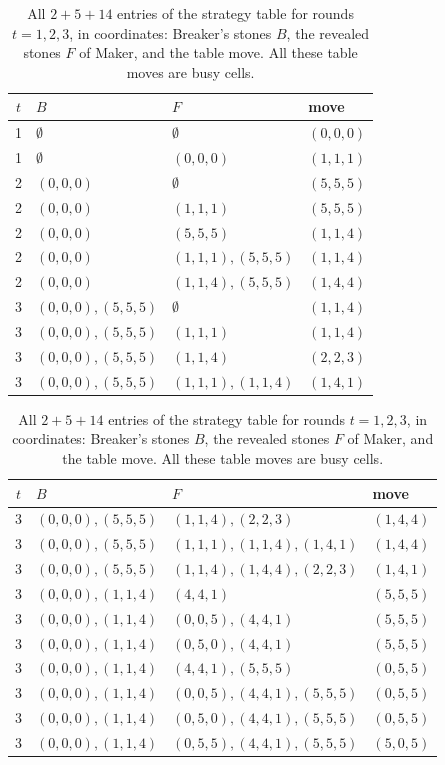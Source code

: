 \begin{table}[ht]
\centering\footnotesize
\begin{tabular}[t]{@{}clll@{}}
\toprule
$t$ & $B$ & $F$ & move\\
\midrule
1 & $\emptyset$ & $\emptyset$ & $(0,0,0)$\\
1 & $\emptyset$ & $(0,0,0)$ & $(1,1,1)$\\
\midrule
2 & $(0,0,0)$ & $\emptyset$ & $(5,5,5)$\\
2 & $(0,0,0)$ & $(1,1,1)$ & $(5,5,5)$\\
2 & $(0,0,0)$ & $(5,5,5)$ & $(1,1,4)$\\
2 & $(0,0,0)$ & $(1,1,1),(5,5,5)$ & $(1,1,4)$\\
2 & $(0,0,0)$ & $(1,1,4),(5,5,5)$ & $(1,4,4)$\\
\midrule
3 & $(0,0,0),(5,5,5)$ & $\emptyset$ & $(1,1,4)$\\
3 & $(0,0,0),(5,5,5)$ & $(1,1,1)$ & $(1,1,4)$\\
3 & $(0,0,0),(5,5,5)$ & $(1,1,4)$ & $(2,2,3)$\\
3 & $(0,0,0),(5,5,5)$ & $(1,1,1),(1,1,4)$ & $(1,4,1)$\\
\bottomrule
\end{tabular}\hfill
\begin{tabular}[t]{@{}clll@{}}
\toprule
$t$ & $B$ & $F$ & move\\
\midrule
3 & $(0,0,0),(5,5,5)$ & $(1,1,4),(2,2,3)$ & $(1,4,4)$\\
3 & $(0,0,0),(5,5,5)$ & $(1,1,1),(1,1,4),(1,4,1)$ & $(1,4,4)$\\
3 & $(0,0,0),(5,5,5)$ & $(1,1,4),(1,4,4),(2,2,3)$ & $(1,4,1)$\\
3 & $(0,0,0),(1,1,4)$ & $(4,4,1)$ & $(5,5,5)$\\
3 & $(0,0,0),(1,1,4)$ & $(0,0,5),(4,4,1)$ & $(5,5,5)$\\
3 & $(0,0,0),(1,1,4)$ & $(0,5,0),(4,4,1)$ & $(5,5,5)$\\
3 & $(0,0,0),(1,1,4)$ & $(4,4,1),(5,5,5)$ & $(0,5,5)$\\
3 & $(0,0,0),(1,1,4)$ & $(0,0,5),(4,4,1),(5,5,5)$ & $(0,5,5)$\\
3 & $(0,0,0),(1,1,4)$ & $(0,5,0),(4,4,1),(5,5,5)$ & $(0,5,5)$\\
3 & $(0,0,0),(1,1,4)$ & $(0,5,5),(4,4,1),(5,5,5)$ & $(5,0,5)$\\
\bottomrule
\end{tabular}
\caption{All $2+5+14$ entries of the strategy table for rounds $t=1,2,3$, in coordinates: Breaker's stones
$B$, the revealed stones $F$ of Maker, and the table move. All these table moves are busy cells.}
\label{tab:opening}
\end{table}

